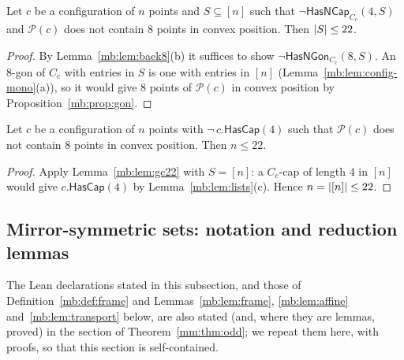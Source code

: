 \begin{lemma}[Baek at $N=8$ on index sets;\\
  \leanref{ErdosSzekeres.Omission.BaekGeometry.geometric_capacity22}{ErdosSzekeres/Omission/BaekGeometry.lean:111}]\label{mb:lem:gc22}\raggedright
Let $c$ be a configuration of $n$ points and $S\subseteq[n]$ such that $\neg\mathsf{HasNCap}_{C_c}(4,S)$ and
$\mathcal P(c)$ does not contain $8$ points in convex position. Then $\lvert S\rvert\le22$.
\end{lemma}

\begin{proof}
By Lemma~\ref{mb:lem:baek8}(b) it suffices to show $\neg\mathsf{HasNGon}_{C_c}(8,S)$. An $8$-gon of $C_c$ with entries in
$S$ is one with entries in $[n]$ (Lemma~\ref{mb:lem:config-mono}(a)), so it would give $8$ points of $\mathcal P(c)$ in
convex position by Proposition~\ref{mb:prop:gon}.
\end{proof}

\begin{proposition}[Baek at $N=8$ for point configurations;\\
  \leanref{MirrorOdd.capacity22g}{MIRRORETV/lean/MirrorMain.lean:1812}]\label{mb:prop:cap22}
Let $c$ be a configuration of $n$ points with $\neg\,c.\mathsf{HasCap}(4)$ such that $\mathcal P(c)$ does not contain $8$
points in convex position. Then $n\le22$.
\end{proposition}

\begin{proof}
Apply Lemma~\ref{mb:lem:gc22} with $S=[n]$: a $C_c$-cap of length $4$ in $[n]$ would give $c.\mathsf{HasCap}(4)$ by
Lemma~\ref{mb:lem:lists}(c). Hence $n=\lvert[n]\rvert\le22$.
\end{proof}

\subsection{Mirror-symmetric sets: notation and reduction lemmas}\label{mb:ssec:red}

The Lean declarations stated in this subsection, and those of Definition~\ref{mb:def:frame} and
Lemmas~\ref{mb:lem:frame}, \ref{mb:lem:affine} and~\ref{mb:lem:transport} below, are also stated (and, where they are
lemmas, proved) in the section of Theorem~\ref{mm:thm:odd}; we repeat them here, with proofs, so that this section is
self-contained.

